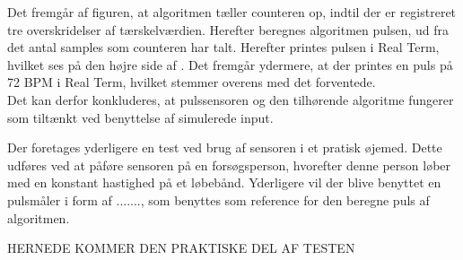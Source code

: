 Det fremgår af figuren, at algoritmen tæller counteren op, indtil der er registreret tre overskridelser af tærskelværdien. Herefter beregnes algoritmen pulsen, ud fra det antal samples som counteren har talt. Herefter printes pulsen i Real Term, hvilket ses på den højre side af . Det fremgår ydermere, at der printes en puls på 72 BPM i Real Term, hvilket stemmer overens med det forventede. \\
Det kan derfor konkluderes, at pulssensoren og den tilhørende algoritme fungerer som tiltænkt ved benyttelse af simulerede input. 

Der foretages yderligere en test ved brug af sensoren i et pratisk øjemed. Dette udføres ved at påføre sensoren på en forsøgsperson, hvorefter denne person løber med en konstant hastighed på et løbebånd. Yderligere vil der blive benyttet en pulsmåler i form af ......., som benyttes som reference for den beregne puls af algoritmen. 

HERNEDE KOMMER DEN PRAKTISKE DEL AF TESTEN






